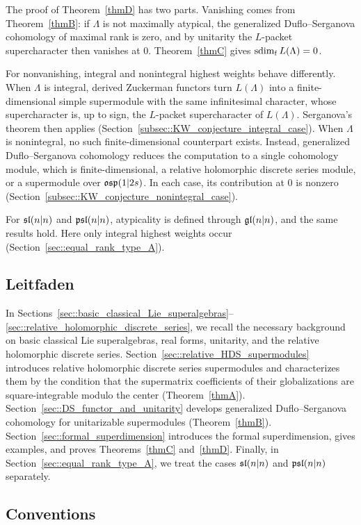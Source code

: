 The proof of Theorem~\ref{thmD} has two parts. Vanishing comes from Theorem~\ref{thmB}: if $\Lambda$ is not maximally atypical, the generalized Duflo--Serganova cohomology of maximal rank is zero, and by unitarity the $L$-packet supercharacter then vanishes at $0$. Theorem~\ref{thmC} gives $\fsdim L(\Lambda)=0$.

For nonvanishing, integral and nonintegral highest weights behave differently. When $\Lambda$ is integral, derived Zuckerman functors turn $L(\Lambda)$ into a finite-dimensional simple supermodule with the same infinitesimal character, whose supercharacter is, up to sign, the $L$-packet supercharacter of $L(\Lambda)$. Serganova's theorem then applies (Section~\ref{subsec::KW_conjecture_integral_case}). When $\Lambda$ is nonintegral, no such finite-dimensional counterpart exists. Instead, generalized Duflo--Serganova cohomology reduces the computation to a single cohomology module, which is finite-dimensional, a relative holomorphic discrete series module, or a supermodule over $\osp(1\vert2s)$. In each case, its contribution at $0$ is nonzero (Section~\ref{subsec::KW_conjecture_nonintegral_case}).

For $\sl(n\vert n)$ and $\psl(n\vert n)$, atypicality is defined through $\gl(n\vert n)$, and the same results hold. Here only integral highest weights occur (Section~\ref{sec::equal_rank_type_A}).

\subsection{Leitfaden}
In Sections~\ref{sec::basic_classical_Lie_superalgebras}--\ref{sec::relative_holomorphic_discrete_series}, we recall the necessary background on basic classical Lie superalgebras, real forms, unitarity, and the relative holomorphic discrete series. Section~\ref{sec::relative_HDS_supermodules} introduces relative holomorphic discrete series supermodules and characterizes them by the condition that the supermatrix coefficients of their globalizations are square-integrable modulo the center (Theorem~\ref{thmA}). Section~\ref{sec::DS_functor_and_unitarity} develops generalized Duflo--Serganova cohomology for unitarizable supermodules (Theorem~\ref{thmB}). Section~\ref{sec::formal_superdimension} introduces the formal superdimension, gives examples, and proves Theorems~\ref{thmC} and~\ref{thmD}. Finally, in Section~\ref{sec::equal_rank_type_A}, we treat the cases $\sl(n\vert n)$ and $\psl(n\vert n)$ separately. 

\subsection{Conventions}
\label{subsec::conventions_intro}

